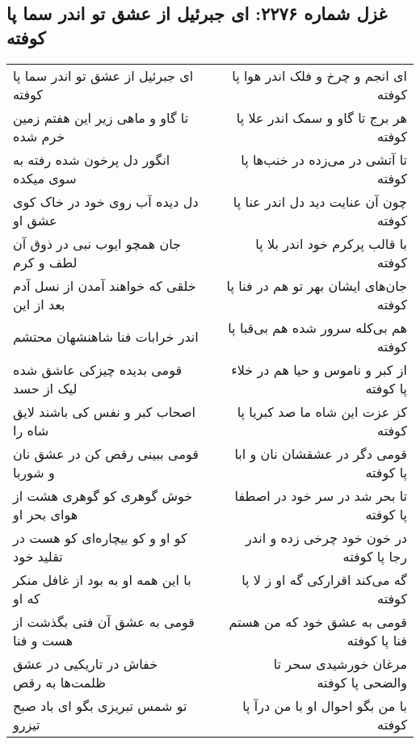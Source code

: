 \begin{center}
\section*{غزل شماره ۲۲۷۶: ای جبرئیل از عشق تو اندر سما پا کوفته}
\label{sec:2276}
\begin{longtable}{l p{0.5cm} r}
ای جبرئیل از عشق تو اندر سما پا کوفته
&&
ای انجم و چرخ و فلک اندر هوا پا کوفته
\\
تا گاو و ماهی زیر این هفتم زمین خرم شده
&&
هر برج تا گاو و سمک اندر علا پا کوفته
\\
انگور دل پرخون شده رفته به سوی میکده
&&
تا آتشی در می‌زده در خنب‌ها پا کوفته
\\
دل دیده آب روی خود در خاک کوی عشق او
&&
چون آن عنایت دید دل اندر عنا پا کوفته
\\
جان همچو ایوب نبی در ذوق آن لطف و کرم
&&
با قالب پرکرم خود اندر بلا پا کوفته
\\
خلقی که خواهند آمدن از نسل آدم بعد از این
&&
جان‌های ایشان بهر تو هم در فنا پا کوفته
\\
اندر خرابات فنا شاهنشهان محتشم
&&
هم بی‌کله سرور شده هم بی‌قبا پا کوفته
\\
قومی بدیده چیزکی عاشق شده لیک از حسد
&&
از کبر و ناموس و حیا هم در خلاء پا کوفته
\\
اصحاب کبر و نفس کی باشند لایق شاه را
&&
کز عزت این شاه ما صد کبریا پا کوفته
\\
قومی ببینی رقص کن در عشق نان و شوربا
&&
قومی دگر در عشقشان نان و ابا پا کوفته
\\
خوش گوهری کو گوهری هشت از هوای بحر او
&&
تا بحر شد در سر خود در اصطفا پا کوفته
\\
کو او و کو بیچاره‌ای کو هست در تقلید خود
&&
در خون خود چرخی زده و اندر رجا پا کوفته
\\
با این همه او به بود از غافل منکر که او
&&
گه می‌کند اقرارکی گه او ز لا پا کوفته
\\
قومی به عشق آن فتی بگذشت از هست و فنا
&&
قومی به عشق خود که من هستم فنا پا کوفته
\\
خفاش در تاریکیی در عشق ظلمت‌ها به رقص
&&
مرغان خورشیدی سحر تا والضحی پا کوفته
\\
تو شمس تبریزی بگو ای باد صبح تیزرو
&&
با من بگو احوال او با من درآ پا کوفته
\\
\end{longtable}
\end{center}
